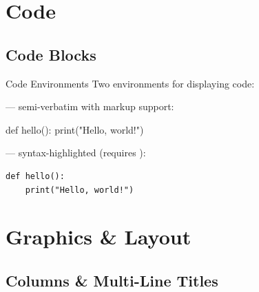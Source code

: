 \documentclass[presentation, aspectratio=169]{beamer}
\begin{document}
\section{Code}

\subsection{Code Blocks}

\begin{frame}[fragile]{Code Environments}
  Two environments for displaying code:

  \vspace{0.4em}
  \textbf{} --- semi-verbatim with \inlinecode{\\alert} markup support:
\begin{codeblock}
def hello():
    \alert{print("Hello, world!")}  %
\end{codeblock}

  \vspace{0.4em}
  \textbf{} --- syntax-highlighted (requires ):
  \begin{verbatim}
def hello():
    print("Hello, world!")
  \end{verbatim}
\end{frame}

\section{Graphics \& Layout}

\subsection{Columns \& Multi-Line Titles}
\end{document}

